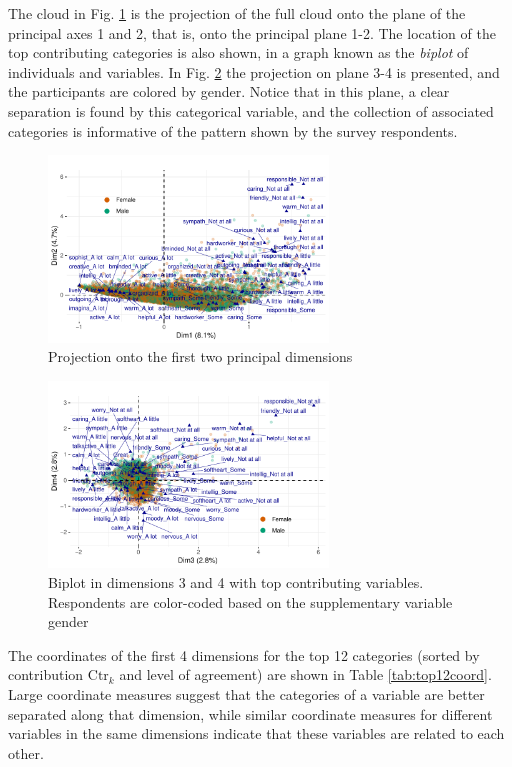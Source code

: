 \documentclass[conference]{IEEEtran}
\begin{document}
The cloud in Fig. \ref{fig:biplot} is the projection of the full cloud
onto the plane of the principal axes 1 and 2, that is, onto the
principal plane 1-2. The location of the top contributing categories is
also shown, in a graph known as the \emph{biplot} of individuals and
variables. In Fig. \ref{fig:plane34} the projection on plane 3-4 is
presented, and the participants are colored by gender. Notice that in
this plane, a clear separation is found by this categorical variable,
and the collection of associated categories is informative of the
pattern shown by the survey respondents.

\begin{figure}[H] 
\centering 
\includegraphics[width=2.93in]{../figs/newbiplot12.pdf}
\caption{Projection onto the first two principal dimensions}
\label{fig:biplot} 
\end{figure}

\begin{figure}[H] 
\centering 
\includegraphics[width=2.93in]{../figs/newbiplot34.pdf}
\caption{Biplot in dimensions 3 and 4 with top contributing variables. Respondents are color-coded based on the supplementary variable gender}
\label{fig:plane34} 
\end{figure}

The coordinates of the first 4 dimensions for the top 12 categories
(sorted by contribution \(\text{Ctr}_k\) and level of agreement) are
shown in Table \ref{tab:top12coord}. Large coordinate measures suggest
that the categories of a variable are better separated along that
dimension, while similar coordinate measures for different variables in
the same dimensions indicate that these variables are related to each
other.
\end{document}
